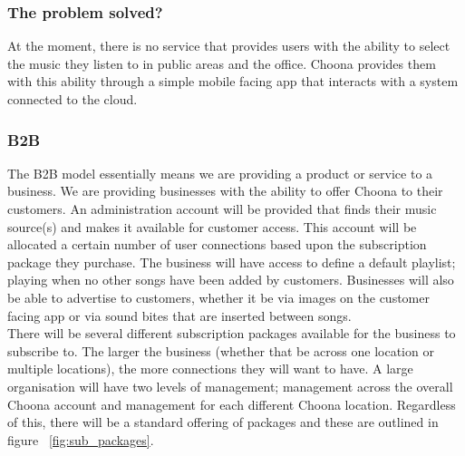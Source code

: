 \subsubsection{The problem solved?}
At the moment, there is no service that provides users with the ability to select the music they listen to in public areas and the office.  Choona provides them with this ability through a simple mobile facing app that interacts with a system connected to the cloud.   \\

\subsubsection{B2B}
The B2B model essentially means we are providing a product or service to a business.  We are providing businesses with the ability to offer Choona to their customers.  An administration account will be provided that finds their music source(s) and makes it available for customer access.  This account will be allocated a certain number of user connections based upon the subscription package they purchase.  The business will have access to define a default playlist; playing when no other songs have been added by customers.  Businesses will also be able to advertise to customers, whether it be via images on the customer facing app or via sound bites that are inserted between songs.  \\
There will be several different subscription packages available for the business to subscribe to.  The larger the business (whether that be across one location or multiple locations), the more connections they will want to have.  A large organisation will have two levels of management; management across the overall Choona account and management for each different Choona location.  Regardless of this, there will be a standard offering of packages and these are outlined in figure ~\ref{fig:sub_packages}.  \\

\noindent{}\\


